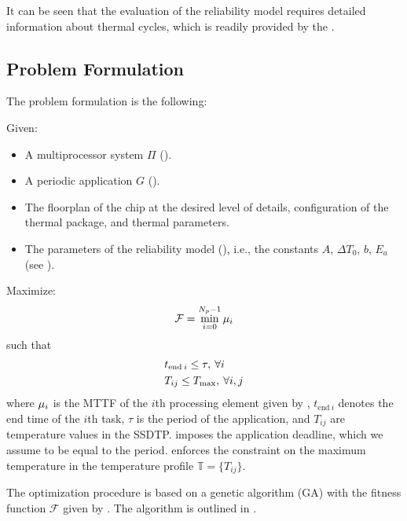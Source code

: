 It can be seen that the evaluation of the reliability model requires detailed
information about thermal cycles, which is readily provided by the .

\subsection{Problem Formulation}

The problem formulation is the following:

Given:
\begin{itemize}

\item A multiprocessor system $\Pi$ ().

\item A periodic application $G$ ().

\item The floorplan of the chip at the desired level of details, configuration
of the thermal package, and thermal parameters.

\item The parameters of the reliability model (), i.e.,
the constants $A$, $\Delta T_0$, $b$, $E_a$ (see ).

\end{itemize}

Maximize:
\begin{equation} \elab{fitness-function}
  \mathcal{F} = \min_{i = 0}^{N_p - 1} \mean_i
\end{equation}
such that
\begin{align}
  & t_{\text{end} \: i} \leq \tau, \: \forall i \elab{deadline} \\
  & T_{ij} \leq T_\text{max}, \: \forall i, j \elab{t-max}
\end{align}
where $\mu_i$ is the MTTF of the $i$th processing element given by
, $t_{\text{end} \: i}$ denotes the end time of
the $i$th task, $\tau$ is the period of the application, and $T_{ij}$ are
temperature values in the SSDTP.  imposes the application
deadline, which we assume to be equal to the period.  enforces the
constraint on the maximum temperature in the temperature profile $\mathbb{T} =
\{ T_{ij} \}$.

The optimization procedure is based on a genetic algorithm (GA)
\cite{schmitz2004} with the fitness function $\mathcal{F}$ given by
. The algorithm is outlined in .

